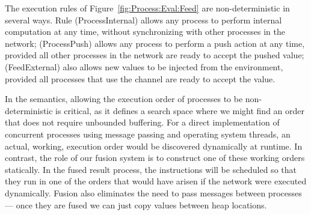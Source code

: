 The execution rules of Figure~\ref{fig:Process:Eval:Feed} are non-deterministic in several ways. Rule (ProcessInternal) allows any process to perform internal computation at any time, without synchronizing with other processes in the network; (ProcessPush) allows any process to perform a push action at any time, provided all other processes in the network are ready to accept the pushed value; (FeedExternal) also allows new values to be injected from the environment, provided all processes that use the channel are ready to accept the value.

In the semantics, allowing the execution order of processes to be non-deterministic is critical, as it defines a search space where we might find an order that does not require unbounded buffering. For a direct implementation of concurrent processes using message passing and operating system threads, an actual, working, execution order would be discovered dynamically at runtime. In contrast, the role of our fusion system is to construct one of these working orders statically. In the fused result process, the instructions will be scheduled so that they run in one of the orders that would have arisen if the network were executed dynamically. Fusion also eliminates the need to pass messages between processes --- once they are fused we can just copy values between heap locations.

